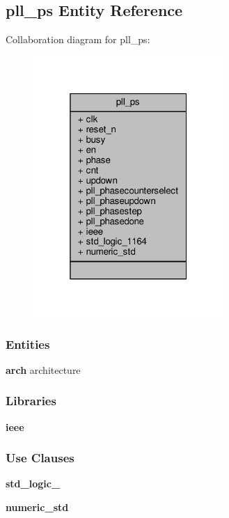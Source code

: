 \subsection{pll\+\_\+ps Entity Reference}
\label{classpll__ps}


Collaboration diagram for pll\+\_\+ps\+:\nopagebreak
\begin{figure}[H]
\begin{center}
\leavevmode
\includegraphics[width=205pt]{d0/d7c/classpll__ps__coll__graph}
\end{center}
\end{figure}
\subsubsection*{Entities}
\begin{DoxyCompactItemize}
\item 
{\bf arch} architecture
\end{DoxyCompactItemize}
\subsubsection*{Libraries}
 \begin{DoxyCompactItemize}
\item 
{\bf ieee} 
\end{DoxyCompactItemize}
\subsubsection*{Use Clauses}
 \begin{DoxyCompactItemize}
\item 
{\bf std\+\_\+logic\+\_}   
\item 
{\bf numeric\+\_\+std}   
\end{DoxyCompactItemize}
